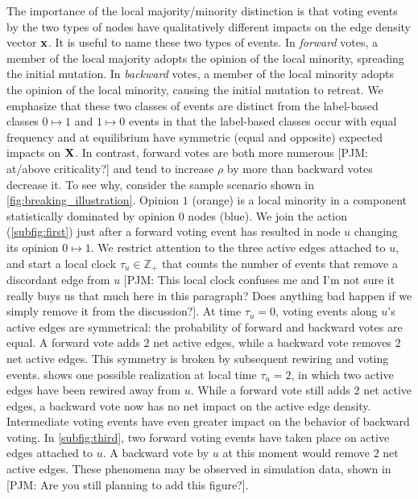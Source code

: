 \documentclass[review, onefignum, onetabnum]{siamart171218}
\newcommand{\pjm}[1]{{\color{blue}[PJM: #1]}}
\begin{document}
		The importance of the local majority/minority distinction is that voting events by the two types of nodes have qualitatively different impacts on the edge density vector $\mathbf{x}$. 
		It is useful to name these two types of events. 
		In \emph{forward} votes, a member of the local majority adopts the opinion of the local minority, spreading the initial mutation. 
		In \emph{backward} votes, a member of the local minority adopts the opinion of the local minority, causing the initial mutation to retreat.  
		We emphasize that these two classes of events are distinct from the label-based classes $0\mapsto 1$ and $1 \mapsto 0$ events in that the label-based classes occur with equal frequency and at equilibrium have symmetric (equal and opposite) expected impacts on $\mathbf{X}$.
		In contrast, forward votes are both more numerous \pjm{at/above criticality?} and tend to increase $\rho$ by more than backward votes decrease it.  
		To see why, consider the sample scenario shown in \cref{fig:breaking_illustration}. 
		Opinion $1$ (orange) is a local minority in a component statistically dominated by opinion $0$ nodes (blue). 
		We join the action (\cref{subfig:first}) just after a forward voting event has resulted in node $u$ changing its opinion $0 \mapsto 1$. 
		We restrict attention to the three active edges attached to $u$, and start a local clock $\tau_u \in \mathbb{Z}_+$ that counts the number of events that remove a discordant edge from $u$ \pjm{This local clock confuses me and I'm not sure it really buys us that much here in this paragraph? Does anything bad happen if we simply remove it from the discussion?}. 
		At time $\tau_u = 0$, voting events along $u$'s active edges are symmetrical: the probability of forward and backward votes are equal. 
		A forward vote adds $2$ net active edges, while a backward vote removes $2$ net active edges. 
		This symmetry is broken by subsequent rewiring and voting events.
		 shows one possible realization at local time $\tau_u = 2$, in which two active edges have been rewired away from $u$. 
		While a forward vote still adds $2$ net active edges, a backward vote now has no net impact on the active edge density. 
		Intermediate voting events have even greater impact on the behavior of backward voting. 
		In \cref{subfig:third}, two forward voting events have taken place on active edges attached to $u$. 
		A backward vote by $u$ at this moment would remove $2$ net active edges. 
		These phenomena may be observed in simulation data, shown in  \pjm{Are you still planning to add this figure?}. 
		
\end{document}
